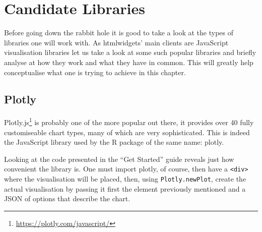 \documentclass[
]{krantz}
\renewcommand{\href}[2]{#2\footnote{\url{#1}}}
\begin{document}
\hypertarget{candidate-libraries}{%
\section*{Candidate Libraries}\label{candidate-libraries}}


Before going down the rabbit hole it is good to take a look at the types of libraries one will work with. As htmlwidgets' main clients are JavaScript visualisation libraries let us take a look at some such popular libraries and briefly analyse at how they work and what they have in common. This will greatly help conceptualise what one is trying to achieve in this chapter.

\hypertarget{plotly}{%
\subsection*{Plotly}\label{plotly}}


\href{https://plotly.com/javascript/}{Plotly.js} is probably one of the more popular out there, it provides over 40 fully customiseable chart types, many of which are very sophisticated. This is indeed the JavaScript library used by the R package of the same name: plotly.

Looking at the code presented in the ``Get Started'' guide reveals just how convenient the library is. One must import plotly, of course, then have a \texttt{\textless{}div\textgreater{}} where the visualisation will be placed, then, using \texttt{Plotly.newPlot}, create the actual visualisation by passing it first the element previously mentioned and a JSON of options that describe the chart.
\end{document}
